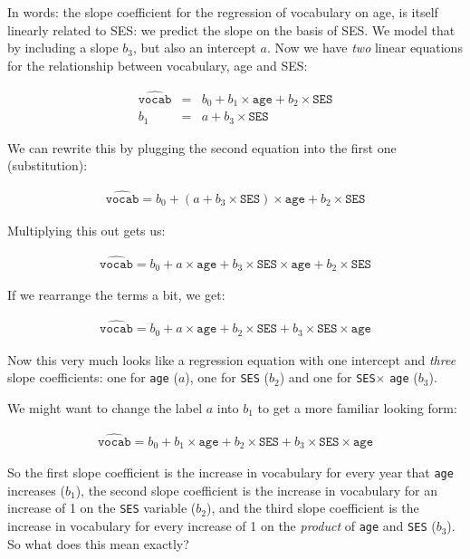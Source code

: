 In words: the slope coefficient for the regression of vocabulary on age, is itself linearly related to SES: we predict the slope on the basis of SES. We model that by including a slope $b_3$, but also an intercept $a$. Now we have \textit{two} linear equations for the relationship between vocabulary, age and SES:

\begin{eqnarray}
\widehat{\texttt{vocab}} &=& b_0 + b_1 \times \texttt{age} + b_2 \times \texttt{SES}  \\
b_1 &=& a + b_3 \times \texttt{SES}
\end{eqnarray}

We can rewrite this by plugging the second equation into the first one (substitution):

\begin{eqnarray}
\widehat{\texttt{vocab}} = b_0 + (a + b_3 \times \texttt{SES})  \times \texttt{age} + b_2 \times \texttt{SES} 
\end{eqnarray}


Multiplying this out gets us:

\begin{eqnarray}
\widehat{\texttt{vocab}} = b_0 + a \times \texttt{age} + b_3 \times \texttt{SES}  \times \texttt{age} + b_2 \times \texttt{SES}
\end{eqnarray}

If we rearrange the terms a bit, we get:

\begin{eqnarray}
\widehat{\texttt{vocab}} = b_0 + a \times \texttt{age} + b_2 \times \texttt{SES} + b_3 \times \texttt{SES}  \times \texttt{age}
\end{eqnarray}

Now this very much looks like a regression equation with one intercept and \textit{three} slope coefficients: one for \texttt{age} ($a$), one for \texttt{SES} ($b_2$) and one for \texttt{SES}$\times$ \texttt{age} ($b_3$).


We might want to change the label $a$ into $b_1$ to get a more familiar looking form:

\begin{eqnarray}
\widehat{\texttt{vocab}} = b_0 + b_1\times \texttt{age} + b_2 \times \texttt{SES} + b_3 \times \texttt{SES}  \times \texttt{age}
\end{eqnarray}

So the first slope coefficient is the increase in vocabulary for every year that \texttt{age} increases ($b_1$), the second slope coefficient is the increase in vocabulary for an increase of 1 on the \texttt{SES} variable ($b_2$), and the third slope coefficient is the increase in vocabulary for every increase of 1 on the \textit{product} of \texttt{age} and \texttt{SES} ($b_3$).
\\
So what does this mean exactly?

